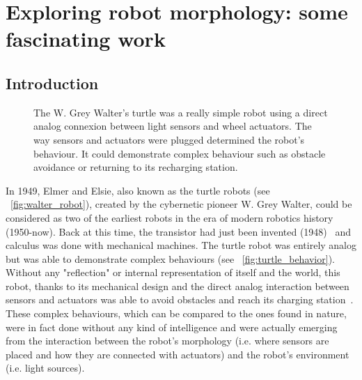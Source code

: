 
\cleartoleftpage


\chapter{Exploring robot morphology: some fascinating work} %
\label{cha:morphology-review}


\section{Introduction} %

\begin{figure}[!b]
\centering
    \hfil
    \caption{The W. Grey Walter's turtle was a really simple robot using a direct analog connexion between light sensors and wheel actuators. The way sensors and actuators were plugged determined the robot’s behaviour. It could demonstrate complex behaviour such as obstacle avoidance or returning to its recharging station.}
    \label{fig:turtle_robot}
\end{figure}


In 1949, Elmer and Elsie, also known as the turtle robots (see \figurename~\ref{fig:walter_robot}), created by the cybernetic pioneer W. Grey Walter, could be considered as two of the earliest robots in the era of modern robotics history (1950-now). Back at this time, the transistor had just been invented (1948)~\parencite{brinkman1997history} and calculus was done with mechanical machines. The turtle robot was entirely analog but was able to demonstrate complex behaviours (see \figurename~\ref{fig:turtle_behavior}). Without any "reflection" or internal representation of itself and the world, this robot, thanks to its mechanical design and the direct analog interaction between sensors and actuators was able to avoid obstacles and reach its charging station~\parencite{walter1950imitation}.
These complex behaviours, which can be compared to the ones found in nature, were in fact done without any kind of intelligence and were actually emerging from the interaction between the robot’s morphology (i.e. where sensors are placed and how they are connected with actuators) and the robot’s environment (i.e. light sources).


